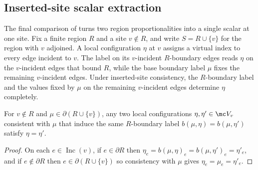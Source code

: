 \subsection{Inserted-site scalar extraction}
\label{subsec:peps_inserted_site_scalar_extraction}

The final comparison of \cite[Section~3, proof of Theorem~3]{Molnar2018NormalPEPS}
turns two region proportionalities into a single scalar at one site. Fix a finite
region $R$ and a site $v\notin R$, and write $S=R\cup\{v\}$ for the
region with $v$ adjoined. A local configuration $\eta$ at $v$ assigns a virtual
index to every edge incident to $v$. The label on its $v$-incident $R$-boundary
edges reads $\eta$ on the $v$-incident edges that bound $R$, while the base
boundary label $\mu$ fixes the remaining $v$-incident edges. Under inserted-site
consistency, the $R$-boundary label and the values fixed by $\mu$ on the
remaining $v$-incident edges determine $\eta$ completely.

\begin{lemma}%
    \label{lem:peps_localConfig_eq_of_insertConsistent}
    \leanok
    For $v\notin R$ and $\mu\in\partial(R\cup\{v\})$, any two local
    configurations $\eta,\eta'\in\mc V_v$ consistent with $\mu$ that induce the
    same $R$-boundary label $b(\mu,\eta)=b(\mu,\eta')$ satisfy $\eta=\eta'$.
\end{lemma}
\begin{proof}\leanok
    On each $e\in\operatorname{Inc}(v)$, if $e\in\partial R$ then
    $\eta_e=b(\mu,\eta)_e=b(\mu,\eta')_e=\eta'_e$, and if $e\notin\partial R$
    then $e\in\partial(R\cup\{v\})$ so consistency with $\mu$ gives
    $\eta_e=\mu_e=\eta'_e$.
\end{proof}

